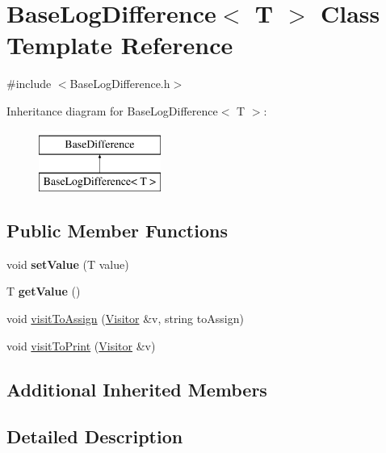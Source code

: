 \hypertarget{classBaseLogDifference}{}\section{Base\+Log\+Difference$<$ T $>$ Class Template Reference}
\label{classBaseLogDifference}


{\ttfamily \#include $<$Base\+Log\+Difference.\+h$>$}

Inheritance diagram for Base\+Log\+Difference$<$ T $>$\+:\begin{figure}[H]
\begin{center}
\leavevmode
\includegraphics[height=2.000000cm]{classBaseLogDifference}
\end{center}
\end{figure}
\subsection*{Public Member Functions}
\begin{DoxyCompactItemize}
\item 
void {\bfseries set\+Value} (T value)\hypertarget{classBaseLogDifference_acaaeeaab163080f9ec47074a8db4fa3d}{}\label{classBaseLogDifference_acaaeeaab163080f9ec47074a8db4fa3d}

\item 
T {\bfseries get\+Value} ()\hypertarget{classBaseLogDifference_a1771f91aacb9e5b12b5d38de64285dc5}{}\label{classBaseLogDifference_a1771f91aacb9e5b12b5d38de64285dc5}

\item 
void \hyperlink{classBaseLogDifference_ad2174b64f0c611ea9398d49226f48f4f}{visit\+To\+Assign} (\hyperlink{classVisitor}{Visitor} \&v, string to\+Assign)
\item 
void \hyperlink{classBaseLogDifference_aedf247712392189dc236bd82e8fa8ea0}{visit\+To\+Print} (\hyperlink{classVisitor}{Visitor} \&v)
\end{DoxyCompactItemize}
\subsection*{Additional Inherited Members}


\subsection{Detailed Description}
